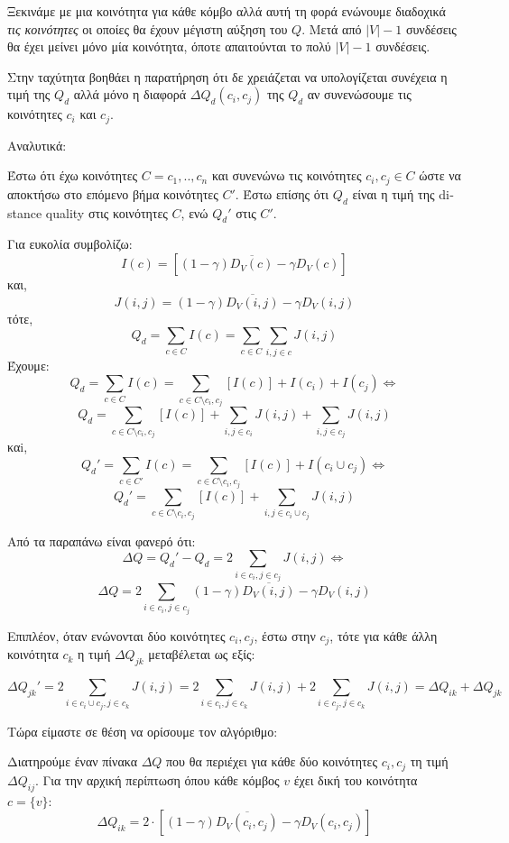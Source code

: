 \documentclass[12pt, letterpaper]{article}
\begin{document}
Ξεκινάμε με μια κοινότητα για κάθε κόμβο αλλά αυτή τη φορά ενώνουμε διαδοχικά \emph{τις κοινότητες} οι οποίες θα έχουν μέγιστη αύξηση του $Q$. Μετά από $|V|-1$ συνδέσεις
θα έχει μείνει μόνο μία κοινότητα, όποτε απαιτούνται το πολύ $|V|-1$ συνδέσεις. 

Στην ταχύτητα βοηθάει η παρατήρηση ότι δε χρειάζεται να υπολογίζεται συνέχεια η τιμή της $Q_d$ αλλά μόνο η διαφορά $\Delta Q_d(c_i,c_j)$ της $Q_d$ αν συνενώσουμε τις 
κοινότητες $c_i$ και $c_j$. 


Αναλυτικά:

Έστω ότι έχω κοινότητες $C = {c_1,..,c_n}$ και συνενώνω τις κοινότητες $c_i,c_j \in C$ ώστε να αποκτήσω
στο επόμενο βήμα κοινότητες $C'$. Έστω επίσης ότι $Q_d$ είναι η τιμή της \textlatin{distance quality}
στις κοινότητες $C$, ενώ $Q_d'$ στις $C'$. 



Για ευκολία συμβολίζω: 
\[ I(c) = [(1 - \gamma)\overline{ D_V(c) } - \gamma D_V(c)] \]
και,
\[ J(i,j) = (1-\gamma) \overline{ D_V(i,j)} - \gamma D_V(i,j) \]
τότε,
\[ Q_d = \sum_{c \in C} I(c) =\sum_{c \in C} \sum_{i,j \in c} J(i,j) \]
Έχουμε:
\[ Q_d  = \sum_{c \in C} I(c) =  \sum_{c \in C \setminus c_i,c_j}[I(c)] + I(c_i) + I(c_j) \Leftrightarrow\]
\[ Q_d = \sum_{c \in C \setminus c_i,c_j}[I(c)] + \sum_{i,j \in c_i}J(i,j) + \sum_{i,j \in c_j}J(i,j)  \]
καi,
\[ Q_d' = \sum_{c \in C'} I(c) =  \sum_{c \in C \setminus c_i,c_j}[I(c)] + I(c_i \cup c_j) \Leftrightarrow \]
\[ Q_d' =  \sum_{c \in C \setminus c_i,c_j}[I(c)] + \sum_{i,j \in c_i \cup c_j} J(i,j) \]



Από τα παραπάνω είναι φανερό ότι:
\[   \Delta Q = Q_d' - Q_d = 2 \sum_{i \in c_i, j \in c_j} J(i,j) \Leftrightarrow \]
\[ \Delta Q = 2 \sum_{i \in c_i, j \in c_j} (1-\gamma) \overline{ D_V(i,j)} - \gamma D_V(i,j) \]

\bigskip

Επιπλέον, όταν ενώνονται δύο κοινότητες $c_i,c_j$, έστω στην $c_j$, τότε για κάθε 
άλλη κοινότητα $c_k$ η τιμή $\Delta Q_{jk}$ μεταβέλεται ως εξίς:

\[ \Delta Q_{jk}' = 2 \sum_{i \in c_i \cup c_j, j \in c_k} J(i,j) = 2 \sum_{i \in c_i, j \in c_k} J(i,j) + 2 \sum_{i \in c_j, j \in c_k} J(i,j) = \Delta Q_{ik} + \Delta Q_{jk}\]


Τώρα είμαστε σε θέση να ορίσουμε τον αλγόριθμο:

Διατηρούμε έναν πίνακα $\Delta Q$ που θα περιέχει για κάθε δύο κοινότητες $c_i,c_j$ 
τη τιμή $\Delta Q_{ij}$. Για την αρχική περίπτωση όπου κάθε κόμβος $v$ έχει δική του 
κοινότητα $c=\{v\}$: 
\begin{equation}   \label{init_dq}
  \Delta Q_{ik} = 2 \cdot [(1-\gamma)\overline{ D_V(c_i,c_j)} - \gamma  D_V(c_i,c_j)   ]
\end{equation}
\end{document}
